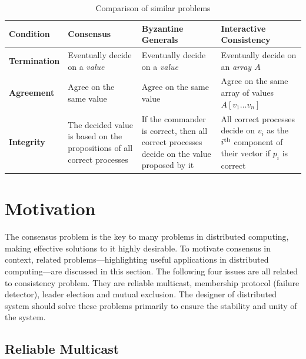 \documentclass[12pt, a4paper]{article}
\begin{document}
\begin{table}[htp]
  \centering
  \begin{tabularx}{\linewidth}{%
    l%
    >{\raggedright\arraybackslash}X%
    >{\raggedright\arraybackslash}X%
    >{\raggedright\arraybackslash}X}
  \toprule
  Condition & Consensus & Byzantine Generals & Interactive Consistency \\
  \midrule
  \textbf{Termination} & Eventually decide on a \textit{value}
    & Eventually decide on a \textit{value}
    & Eventually decide on an \textit{array $A$} \\
  \addlinespace
  \textbf{Agreement} & Agree on the same value
    & Agree on the same value
    & Agree on the same array of values $A[v_{1} \ldots v_{n}]$ \\
  \addlinespace
  \textbf{Integrity}
    & The decided value is based on the propositions of all correct processes
    & If the commander is correct, then all correct processes decide on the
      value proposed by it
    & All correct processes decide on $v_{i}$ as the $i\textsuperscript{th}$
      component of their vector if $p_{i}$ is correct \\
  \bottomrule
\end{tabularx}
  \caption{Comparison of similar problems}
  \label{tab:dbtap}
\end{table}


\section{Motivation}
\label{sec:motivation}

The consensus problem is the key to many problems in distributed computing, making effective solutions to it highly desirable\cite{fritzke2001consensus}. To motivate consensus in context, related problems—highlighting useful applications in distributed computing—are discussed in this section. The following four issues are all related to consistency problem. They are reliable multicast, membership protocol (failure detector), leader election and mutual exclusion. The designer of distributed system should solve these problems primarily to ensure the stability and unity of the system.

\subsection{Reliable Multicast}
\end{document}
